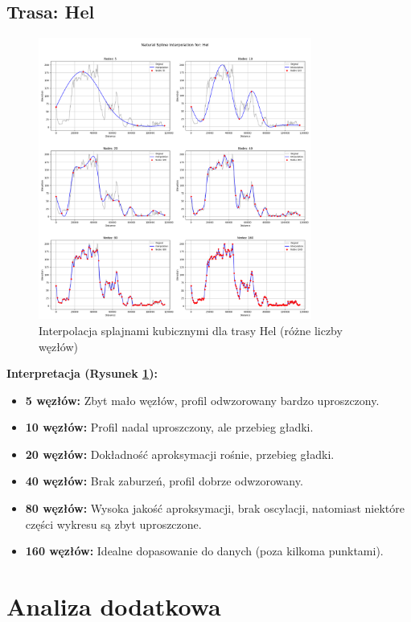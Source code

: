 \documentclass[11pt,a4paper]{article}
\begin{document}
\subsection{Trasa: Hel}
\begin{figure}[H]
    \centering
    \includegraphics[width=0.8\textwidth]{../plots/Hel_Spline_basic.png}
    \caption{Interpolacja splajnami kubicznymi dla trasy Hel (różne liczby węzłów)}
    \label{fig:hej_splajny}
\end{figure}
\textbf{Interpretacja (Rysunek \ref{fig:hej_splajny}):} 
\begin{itemize}
    \item \textbf{5 węzłów:} Zbyt mało węzłów, profil odwzorowany bardzo uproszczony.
    \item \textbf{10 węzłów:} Profil nadal uproszczony, ale przebieg gładki.
    \item \textbf{20 węzłów:} Dokładność aproksymacji rośnie, przebieg gładki.
    \item \textbf{40 węzłów:} Brak zaburzeń, profil dobrze odwzorowany.
    \item \textbf{80 węzłów:} Wysoka jakość aproksymacji, brak oscylacji, natomiast niektóre części wykresu są zbyt uproszczone.
    \item \textbf{160 węzłów:} Idealne dopasowanie do danych (poza kilkoma punktami).
\end{itemize}

\section{Analiza dodatkowa}
\end{document}
